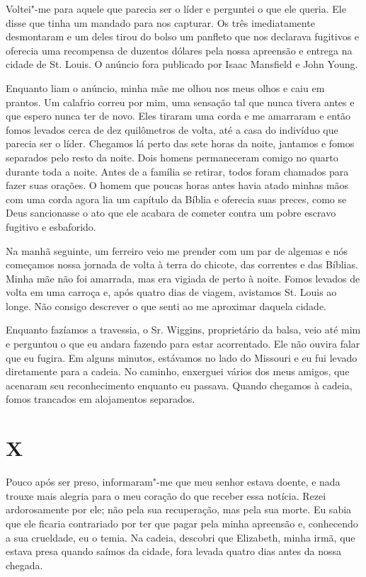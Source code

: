 Voltei"-me para aquele que parecia ser o líder e perguntei o que ele
queria. Ele disse que tinha um mandado para nos capturar. Os três
imediatamente desmontaram e um deles tirou do bolso um panfleto que nos
declarava fugitivos e oferecia uma recompensa de duzentos dólares pela
nossa apreensão e entrega na cidade de St. Louis. O anúncio fora
publicado por Isaac Mansfield e John Young.

Enquanto liam o anúncio, minha mãe me olhou nos meus olhos e caiu em
prantos. Um calafrio correu por mim, uma sensação tal que nunca tivera
antes e que espero nunca ter de novo. Eles tiraram uma corda e me
amarraram e então fomos levados cerca de dez quilômetros de volta, até a
casa do indivíduo que parecia ser o líder. Chegamos lá perto das sete
horas da noite, jantamos e fomos separados pelo resto da noite. Dois
homens permaneceram comigo no quarto durante toda a noite. Antes de a
família se retirar, todos foram chamados para fazer suas orações. O
homem que poucas horas antes havia atado minhas mãos com uma corda agora
lia um capítulo da Bíblia e oferecia suas preces, como se Deus
sancionasse o ato que ele acabara de cometer contra um pobre escravo
fugitivo e esbaforido.

Na manhã seguinte, um ferreiro veio me prender com um par de algemas e
nós começamos nossa jornada de volta à terra do chicote, das correntes e
das Bíblias. Minha mãe não foi amarrada, mas era vigiada de perto à
noite. Fomos levados de volta em uma carroça e, após quatro dias de
viagem, avistamos St. Louis ao longe. Não consigo descrever o que senti
ao me aproximar daquela cidade.

Enquanto fazíamos a travessia, o Sr. Wiggins, proprietário da balsa,
veio até mim e perguntou o que eu andara fazendo para estar acorrentado.
Ele não ouvira falar que eu fugira. Em alguns minutos, estávamos no lado
do Missouri e eu fui levado diretamente para a cadeia. No caminho,
enxerguei vários dos meus amigos, que acenaram seu reconhecimento
enquanto eu passava. Quando chegamos à cadeia, fomos trancados em
alojamentos separados.

\chapter{X}

Pouco após ser preso, informaram"-me que meu senhor estava doente, e nada
trouxe mais alegria para o meu coração do que receber essa notícia.
Rezei ardorosamente por ele; não pela sua recuperação, mas pela sua
morte. Eu sabia que ele ficaria contrariado por ter que pagar pela minha
apreensão e, conhecendo a sua crueldade, eu o temia. Na cadeia, descobri
que Elizabeth, minha irmã, que estava presa quando saímos da cidade,
fora levada quatro dias antes da nossa chegada.

